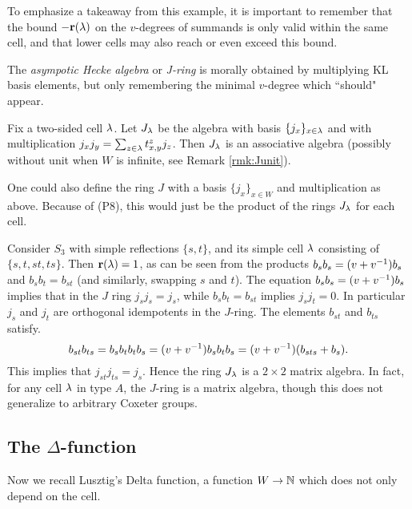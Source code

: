 To emphasize a takeaway from this example, it is important to remember that the bound $-\mathbf{r}(\lambda)$ on the $v$-degrees of summands is only valid within the same cell, and that lower cells
may also reach or even exceed this bound.

The \emph{asympotic Hecke algebra} or \emph{J-ring} is morally obtained by multiplying KL basis elements, but only remembering the minimal $v$-degree which ``should" appear.

\begin{prop} \label{prop:Jassoc} Fix a two-sided cell $\lambda$. Let $J_{\lambda}$ be the algebra with basis $\{j_x\}_{x \in \lambda}$ and with multiplication $j_x j_y = \sum_{z \in \lambda} t^z_{x,y} j_z$. Then $J_\lambda$ is an associative algebra (possibly without unit when $W$ is infinite, see Remark \ref{rmk:Junit}). \end{prop}

\begin{remark} One could also define the ring $J$ with a basis $\{j_x\}_{x \in W}$ and multiplication as above. Because of (P8), this would just be the product of the rings $J_\lambda$ for each cell. \end{remark}

\begin{ex} Consider $S_3$ with simple reflections $\{s,t\}$, and its simple cell $\lambda$ consisting of $\{s,t, st, ts\}$. Then $\mathbf{r}(\lambda)=1$, as can be seen from the products $b_s b_s =
(v+v^{-1})b_s$ and $b_s b_t = b_{st}$ (and similarly, swapping $s$ and $t$). The equation $b_sb_s=(v+v^{-1})b_s$ implies that in the $J$ ring $j_s j_s = j_s$, while $b_s b_t=b_{st}$
implies $j_s j_t=0$. In particular $j_s$ and $j_t$ are orthogonal idempotents in the $J$-ring. The elements $b_{st}$ and $b_{ts}$ satisfy. \[ b_{st}b_{ts}=b_sb_tb_tb_s =
(v+v^{-1})b_sb_tb_s=(v+v^{-1})(b_{sts}+b_s). \] This implies that $j_{st} j_{ts} = j_s$. Hence the ring $J_\lambda$ is a $2\times2$ matrix algebra. In fact, for any cell $\lambda$ in type $A$, the
$J$-ring is a matrix algebra, though this does not generalize to arbitrary Coxeter groups. \end{ex}

\subsection{The $\Delta$-function}
\label{subsec:Dfunc}

Now we recall Lusztig's Delta function, a function $W \rightarrow {\mathbb{N}}$ which does not only depend on the cell.

